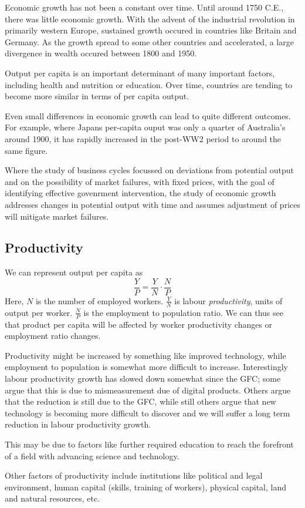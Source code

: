 \documentclass[12pt]{report}
\begin{document}
\begin{flushleft}
Economic growth has not been a constant over time. Until around 1750 C.E.,
there was little economic growth. With the advent of the industrial revolution
in primarily western Europe, sustained growth occured in countries like Britain
and Germany. As the growth spread to some other countries and accelerated, a
large divergence in wealth occured between 1800 and 1950. \par
Output per capita is an important determinant of many important factors,
including health and nutrition or education. Over time, countries are tending
to become more similar in terms of per capita output. \par
Even small differences in economic growth can lead to quite different outcomes.
For example, where Japans per-capita ouput was only a quarter of Australia's
around 1900, it has rapidly increased in the post-WW2 period to around the same
figure. \par
Where the study of business cycles focussed on deviations from potential
output and on the possibility of market failures, with fixed prices, with the
goal of identifying effective govenrment intervention, the study of economic
growth addresses changes in potential output with time and assumes adjustment
of prices will mitigate market failures.

\subsection*{Productivity}

We can represent output per capita as
\[\frac{Y}{P} = \frac{Y}{N}\cdot\frac{N}{P}\]
Here, \(N\) is the number of employed workers. \(\frac{Y}{N}\) is labour
\textit{productivity}, units of output per worker. \(\frac{N}{P}\) is the
employment to population ratio. We can thus see that product per capita will
be affected by worker productivity changes or employment ratio changes. \par
Productivity might be increased by something like improved technology, while
employment to population is somewhat more difficult to increase. Interestingly
labour productivity growth has slowed down somewhat since the GFC; some argue
that this is due to mismeasurement due of digital products. Others argue that
the reduction is still due to the GFC, while still others argue that new
technology is becoming more difficult to discover and we will suffer a long
term reduction in labour productivity growth. \par
This may be due to factors like further required education to reach the
forefront of a field with advancing science and technology. \par
Other factors of productivity include institutions like political and legal
environment, human capital (skills, training of workers), physical capital,
land and natural resources, etc.


\end{flushleft}
\end{document}

